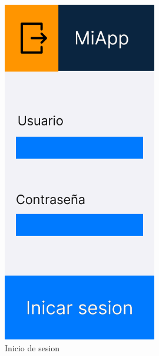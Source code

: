 \begin{figure}[H]
   \centering
    \includegraphics[width=0.6\textwidth]{fotos/Frame 22-1.png}
    \caption{Inicio de sesion}
    \label{fig:Inicio de sesion}
\end{figure}
